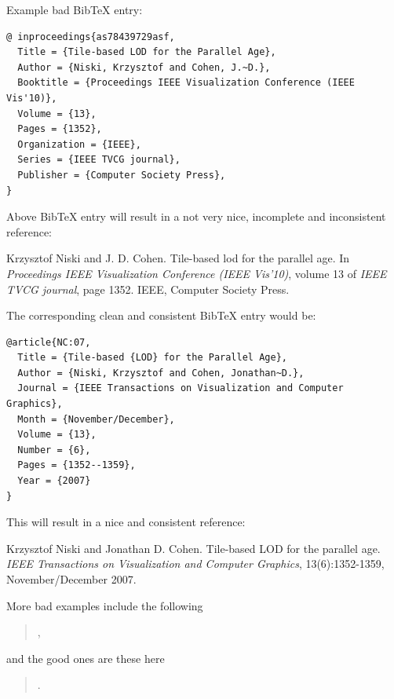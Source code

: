 \documentclass[11pt, a4paper,oneside,chapterprefix=false]{scrbook}
\begin{document}
\noindent
Example bad BibTeX entry:

\begin{verbatim}
@ inproceedings{as78439729asf,
  Title = {Tile-based LOD for the Parallel Age},
  Author = {Niski, Krzysztof and Cohen, J.~D.},
  Booktitle = {Proceedings IEEE Visualization Conference (IEEE Vis'10)},
  Volume = {13},
  Pages = {1352},
  Organization = {IEEE},
  Series = {IEEE TVCG journal},
  Publisher = {Computer Society Press},
}
\end{verbatim}

\noindent
Above BibTeX entry will result in a not very nice, incomplete and inconsistent reference:

\smallskip
\noindent
[NC] Krzysztof Niski and J. D. Cohen. Tile-based lod for the parallel age. In \emph{Proceedings IEEE Visualization Conference (IEEE Vis'10)}, volume 13 of \emph{IEEE TVCG journal}, page 1352. IEEE, Computer Society Press.

\bigskip
\noindent
The corresponding clean and consistent BibTeX entry would be:

\begin{verbatim}
@article{NC:07,
  Title = {Tile-based {LOD} for the Parallel Age},
  Author = {Niski, Krzysztof and Cohen, Jonathan~D.},
  Journal = {IEEE Transactions on Visualization and Computer Graphics},
  Month = {November/December},
  Volume = {13},
  Number = {6},
  Pages = {1352--1359},
  Year = {2007}
}
\end{verbatim}

\noindent
This will result in a nice and consistent reference:

\smallskip
\noindent
[NC07]  Krzysztof Niski and Jonathan D. Cohen. Tile-based LOD for the parallel age. \emph{IEEE Transactions on Visualization and Computer Graphics}, 13(6):1352-1359, November/December 2007.

\vspace{5mm}
More bad examples include the following
\begin{quotation}
\cite{HWH:10bad,Suss:10bad,HXS:09bad,CH:09bad,Strugar:10bad,Fout:07bad,WGS:07bad,CMF:05bad,AGLMR:02bad,Koltun:00bad,CYHPK:97bad}, 
\end{quotation}

and the good ones are these here
\begin{quotation}
\cite{HWH:10,SWF:10,HXS:09,CH:09,Strugar:10,FM:07,WGS:07,CMF:05,AGLMR:02,KCC:00,CYHPK:97}.
\end{quotation}


\end{document}
